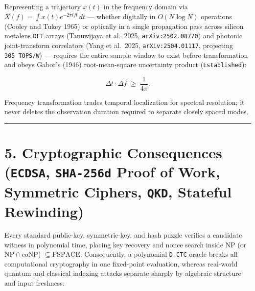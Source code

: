 \documentclass[10pt,letterpaper]{article}
\begin{document}
Representing a trajectory \(x(t)\) in the frequency domain via
\(X(f) = \int x(t) e^{-2\pi i f t}\,dt\) --- whether digitally in
\(O(N \log N)\) operations (Cooley and Tukey 1965) or optically in a
single propagation pass across silicon metalens \texttt{DFT} arrays
(Tanuwijaya et al.~2025, \texttt{arXiv:2502.\allowbreak{}08770}) and photonic
joint-transform correlators (Yang et al.~2025,
\texttt{arXiv:2504.\allowbreak{}01117}, projecting \texttt{305\ TOPS/\allowbreak{}W}) --- requires
the entire sample window to exist before transformation and obeys
Gabor's (1946) root-mean-square uncertainty product
(\texttt{Established}):

\[\Delta t \cdot \Delta f \;\ge\; \frac{1}{4\pi}.\]

Frequency transformation trades temporal localization for spectral
resolution; it never deletes the observation duration required to
separate closely spaced modes.

\begin{center}\rule{0.5\linewidth}{0.5pt}\end{center}

\section{\texorpdfstring{5. Cryptographic Consequences (\texttt{ECDSA},
\texttt{SHA-256d} Proof of Work, Symmetric Ciphers, \texttt{QKD},
Stateful
Rewinding)}{5. Cryptographic Consequences (ECDSA, SHA-256d Proof of Work, Symmetric Ciphers, QKD, Stateful Rewinding)}}\label{cryptographic-consequences-ecdsa-sha-256d-proof-of-work-symmetric-ciphers-qkd-stateful-rewinding}

Every standard public-key, symmetric-key, and hash puzzle verifies a
candidate witness in polynomial time, placing key recovery and nonce
search inside \(\mathrm{NP}\) (or \(\mathrm{NP} \cap \mathrm{coNP}\))
\(\subseteq \mathrm{PSPACE}\). Consequently, a polynomial \texttt{D-CTC}
oracle breaks all computational cryptography in one fixed-point
evaluation, whereas real-world quantum and classical indexing attacks
separate sharply by algebraic structure and input freshness:
\end{document}
